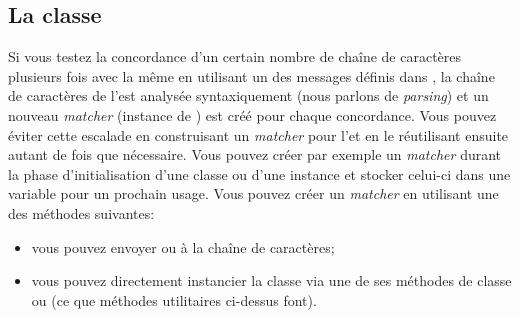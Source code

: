 \documentclass[a4paper,10pt,twoside]{book}
\begin{document}
{%
\subsection{La classe }

Si vous testez la concordance d'un certain nombre de chaîne de
caractères plusieurs fois avec la même \expreg en utilisant un des
messages définis dans , la chaîne de caractères de
l'\expreg est analysée syntaxiquement
(nous parlons de \emph{parsing})
et un nouveau \emph{matcher}
(instance de )
est créé pour chaque concordance. Vous pouvez éviter cette escalade en
construisant un \emph{matcher} pour l'\expreg et en le réutilisant
ensuite autant de fois que nécessaire. Vous pouvez créer par exemple
un \emph{matcher} durant la phase d'initialisation d'une classe ou
d'une instance et stocker celui-ci dans une variable pour un
prochain usage. Vous pouvez créer un \emph{matcher} en utilisant une
des méthodes suivantes:

\begin{itemize}
\item vous pouvez envoyer  ou
   à la chaîne de caractères;
\item vous pouvez directement instancier la classe  via
  une de ses méthodes de classe  ou
   (ce que méthodes
  utilitaires ci-dessus font).

%

\end{itemize}

}
\end{document}
